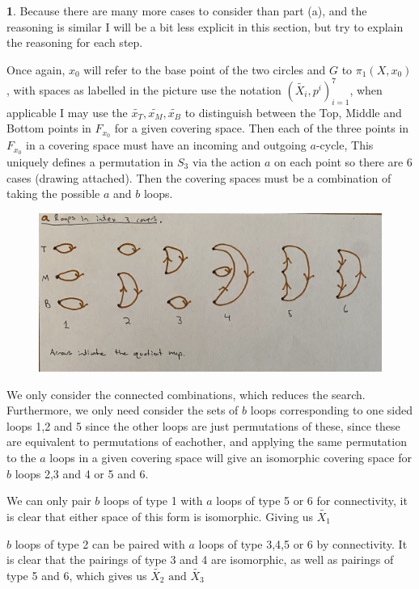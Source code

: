 \documentclass[10.5pt]{article}
\theoremstyle{definition}
\newtheorem{pb}{}
\newcommand{\tand}{\text{ and }}
\begin{document}
\begin{pb}
        Because there are many more cases to consider than part (a), and the reasoning is similar I will be a bit less explicit in this section, but try to explain the reasoning for each step.

        Once again, \(x_0\) will refer to the base point of the two circles and \(G\) to \(\pi_1(X,x_0)\), with spaces as labelled in the picture use the notation \((\tilde{X_i},p^i)_{i=1}^7\), when applicable I may use the \(\tilde{x_T},\tilde{x_M},\tilde{x_B}\) to distinguish between the Top, Middle and Bottom points in \(F_{x_0}\) for a given covering space. Then each of the three points in \(F_{x_0}\) in a covering space must have an incoming and outgoing \(a\)-cycle, This uniquely defines a permutation in \(S_3\) via the action \(a\) on each point so there are 6 cases (drawing attached). Then the covering spaces must be a combination of taking the possible \(a\) and \(b\) loops.

        \begin{figure}[h]
            \centering
            \includegraphics[width = \textwidth]{graphics/One sided loops.jpg}
        \end{figure}

        We only consider the connected combinations, which reduces the search. Furthermore, we only need consider the sets of \(b\) loops corresponding to one sided loops 1,2 and 5 since the other loops are just permutations of these, since these are equivalent to permutations of eachother, and applying the same permutation to the \(a\) loops in a given covering space will give an isomorphic covering space for \(b\) loops 2,3 and 4 or 5 and 6.
        
        We can only pair \(b\) loops of type 1 with \(a\) loops of type 5 or 6 for connectivity, it is clear that either space of this form is isomorphic. Giving us \(\tilde{X_1}\)

        \(b\) loops of type 2 can be paired with \(a\) loops of type 3,4,5 or 6 by connectivity. It is clear that the pairings of type 3 and 4 are isomorphic, as well as pairings of type 5 and 6, which gives us \(\tilde{X_2} \tand \tilde{X_3}\)


\end{pb}
\end{document}
